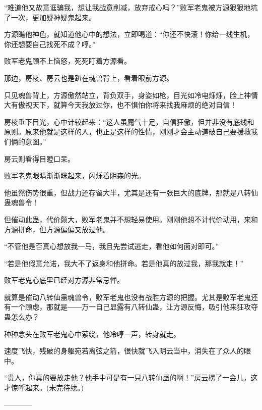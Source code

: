 \begin{this_body}
“难道他又故意诓骗我，想让我战意削减，放弃戒心吗？”败军老鬼被方源狠狠地坑了一次，更加疑神疑鬼起来。

方源瞧他神色，就知道他心中的想法，立即喝道：“你还不快滚！你给一线生机，你还想要自己找死不成？哼。”

败军老鬼顾不上恼怒，死死盯着方源看。

那边，房棱、房云也是趴在魂兽背上，看着眼前方源。

只见魂兽背上，方源傲然站立，背负双手，身姿如枪，目光如冷电烁烁，脸上神情大有傲视天下，就算今天我放过你，也不惧怕你将来找我麻烦的绝对自信！

房棱垂下目光，心中计较起来：“这人虽魔气十足，自信狂傲，但并非没有底线和原则。原来他就是这样的人，也正是这样的性情，刚刚才会主动道破自己要援救我们俩的意图。”

房云则看得目瞪口呆。

败军老鬼眼睛渐渐眯起来，闪烁着阴森的光。

他虽然伤势很重，但战力还存留大半，尤其是还有一张巨大的底牌，那就是八转仙蛊魂兽令！

但催动此蛊，代价颇大，败军老鬼并不想轻易使用。刚刚他想不计代价动用，来和方源拼命，但方源偏偏又放过他。

“不管他是否真心想放我一马，我且先尝试逃走，看他如何面对即可。”

“若是他假意允诺，我大不了返身和他拼命。若是他真的放过我，那我就走！”

败军老鬼心底里已经对方源非常忌惮。

就算是催动八转仙蛊魂兽令，败军老鬼也没有战胜方源的把握。尤其是败军老鬼还有一个顾虑，那就是――万一自己显露有八转仙蛊，让方源反悔，吸引他来狂攻夺蛊怎么办？

种种念头在败军老鬼心中萦绕，他冷哼一声，转身就走。

速度飞快，残破的身躯宛若离弦之箭，很快就飞入阴云当中，消失在了众人的眼中。

“贵人，你真的要放走他？他手中可是有一只八转仙蛊的啊！”房云楞了一会儿，这才惊呼起来。(未完待续。)

------------

\end{this_body}

